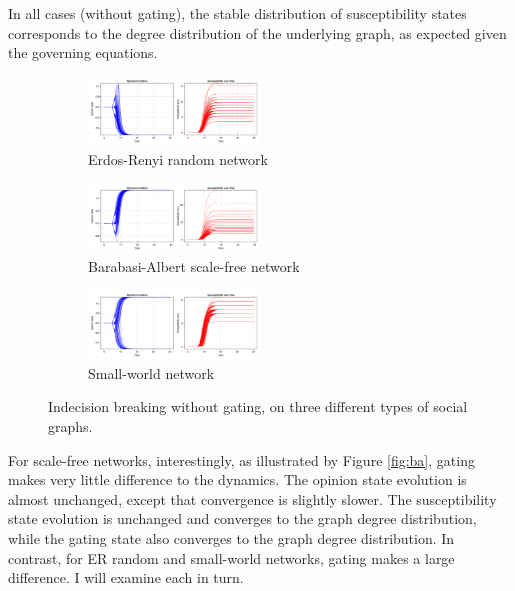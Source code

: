 \documentclass[]{article}
\begin{document}
In all cases (without gating), the stable distribution of susceptibility states corresponds to the degree distribution of the underlying graph, as expected given the governing equations.

\begin{figure}
	\begin{subfigure}{\linewidth}
		\centering
		\includegraphics[width=0.5\textwidth]{../plots/nvar0_nog_homd_hisig_g05_ER4_s92391} 
		\caption{Erdos-Renyi random network}  \label{fig:ng1}
	\end{subfigure}
	
	\begin{subfigure}{\linewidth}
		\centering
		\includegraphics[width=0.5\textwidth]{../plots/nvar0_nog_homd_hisig_g05_BA3_s92391}
		\caption{Barabasi-Albert scale-free network} \label{fig:ng2}
	\end{subfigure}
	
	\begin{subfigure}{\linewidth}
		\centering
		\includegraphics[width=0.5\textwidth]{../plots/nvar0_nog_homd_hisig_g05_WS4_s92391} 
		\caption{Small-world network}  \label{fig:ng3}
	\end{subfigure}
	
	\caption{Indecision breaking without gating, on three different types of social graphs.}
	\label{fig:ng}
\end{figure}

For scale-free networks, interestingly, as illustrated by Figure \ref{fig:ba}, gating makes very little difference to the dynamics. The opinion state evolution is almost unchanged, except that convergence is slightly slower. The susceptibility state evolution is unchanged and converges to the graph degree distribution, while the gating state also converges to the graph degree distribution. In contrast, for ER random and small-world networks, gating makes a large difference. I will examine each in turn.
\end{document}
